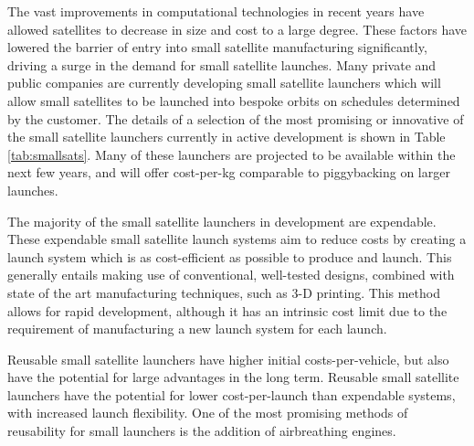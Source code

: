     
    The vast improvements in computational technologies in recent years have allowed satellites to decrease in size and cost to a large degree. These factors have lowered the barrier of entry into small satellite manufacturing significantly, driving a surge in the demand for small satellite launches. Many private and public companies are currently developing small satellite launchers which will allow small satellites to be launched into bespoke orbits on schedules determined by the customer\cite{Faa2018}. The details of a selection of the most promising or innovative of the small satellite launchers currently in active development is shown in Table \ref{tab:smallsats}. Many of these launchers are projected to be available within the next few years, and will offer cost-per-kg comparable to piggybacking on larger launches. 
    
    
    
    The majority of the small satellite launchers in development are expendable\cite{Niederstrasser2015}. These expendable small satellite launch systems aim to reduce costs by creating a launch system which is as cost-efficient as possible to produce and launch\cite{Niederstrasser2015}. This generally entails making use of conventional, well-tested designs, combined with state of the art manufacturing techniques, such as 3-D printing\cite{Niederstrasser2015,Gilmour}. This method allows for rapid development, although it has an intrinsic cost limit due to the requirement of manufacturing a new launch system for each launch.  
    
    Reusable small satellite launchers have higher initial costs-per-vehicle, but also have the potential for large advantages in the long term\cite{Preller2017b}. Reusable small satellite launchers have the potential for lower cost-per-launch than expendable systems, with increased launch flexibility\cite{Preller2017b}. 
    One of the most promising methods of reusability for small launchers is the addition of airbreathing engines\cite{Smart2009}.
    
    
    